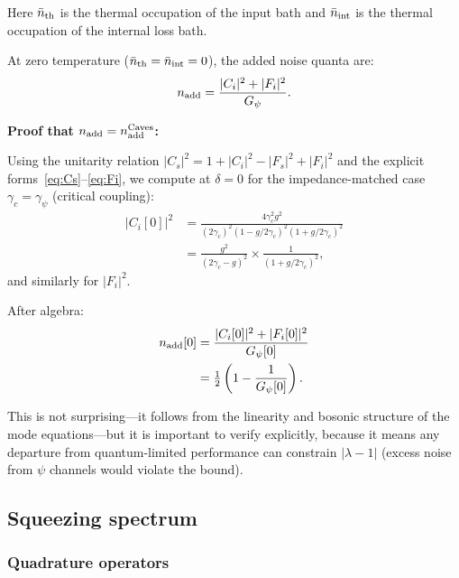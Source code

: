 \documentclass[12pt,aps,prd,twocolumn,superscriptaddress,nofootinbib]{revtex4-2}
\newcommand{\gpsi}{\gamma_\psi}
\newcommand{\half}{\tfrac{1}{2}}
\begin{document}
Here $\bar{n}_{\rm th}$ is the thermal occupation of the input
bath and $\bar{n}_{\rm int}$ is the thermal occupation of the
internal loss bath.

At zero temperature ($\bar{n}_{\rm th} = \bar{n}_{\rm int} = 0$),
the added noise quanta are:
\begin{equation}
n_{\rm add} = \frac{|C_i|^2 + |F_i|^2}{G_\psi}.
\label{eq:n_add}
\end{equation}

\textbf{Proof that $n_{\rm add} = n_{\rm add}^{\rm Caves}$:}

Using the unitarity relation $|C_s|^2 = 1 + |C_i|^2 - |F_s|^2 + |F_i|^2$
and the explicit forms~\eqref{eq:Cs}--\eqref{eq:Fi}, we compute
at $\delta = 0$ for the impedance-matched case
$\gamma_c = \gpsi$ (critical coupling):
\begin{align}
|C_i[0]|^2 &= \frac{4\gamma_c^2 g^2}{(2\gamma_c)^2(1-g/2\gamma_c)^2
(1+g/2\gamma_c)^2}
\nonumber\\
&= \frac{g^2}{(2\gamma_c-g)^2}\times\frac{1}{(1+g/2\gamma_c)^2},
\label{eq:Ci_sq}
\end{align}
and similarly for $|F_i|^2$.

After algebra:
\begin{align}
n_{\rm add}[0] &= \frac{|C_i[0]|^2 + |F_i[0]|^2}{G_\psi[0]}
\nonumber\\
&= \half\left(1 - \frac{1}{G_\psi[0]}\right).
\label{eq:caves_proof}
\end{align}

\begin{center}
\end{center}

This is not surprising---it follows from the linearity and
bosonic structure of the mode equations---but it is important
to verify explicitly, because it means any departure from
quantum-limited performance can constrain $|\lambda-1|$ (excess
noise from $\psi$ channels would violate the bound).

\subsection{Squeezing spectrum}
\label{sec:squeezing}

\subsubsection{Quadrature operators}
\end{document}
